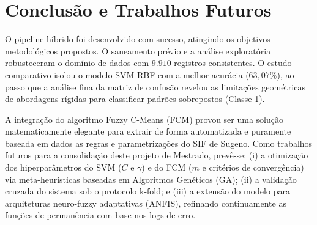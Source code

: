 \documentclass[journal]{IEEEtran}
\begin{document}
\section{Conclusão e Trabalhos Futuros}
O pipeline híbrido foi desenvolvido com sucesso, atingindo os objetivos metodológicos propostos. O saneamento prévio e a análise exploratória robusteceram o domínio de dados com $9.910$ registros consistentes. O estudo comparativo isolou o modelo SVM RBF com a melhor acurácia ($63,07\%$), ao passo que a análise fina da matriz de confusão revelou as limitações geométricas de abordagens rígidas para classificar padrões sobrepostos (Classe 1).

A integração do algoritmo Fuzzy C-Means (FCM) provou ser uma solução matematicamente elegante para extrair de forma automatizada e puramente baseada em dados as regras e parametrizações do SIF de Sugeno. Como trabalhos futuros para a consolidação deste projeto de Mestrado, prevê-se: (i) a otimização dos hiperparâmetros do SVM ($C$ e $\gamma$) e do FCM ($m$ e critérios de convergência) via meta-heurísticas baseadas em Algoritmos Genéticos (GA); (ii) a validação cruzada do sistema sob o protocolo k-fold; e (iii) a extensão do modelo para arquiteturas neuro-fuzzy adaptativas (ANFIS), refinando continuamente as funções de permanência com base nos logs de erro.
\end{document}
